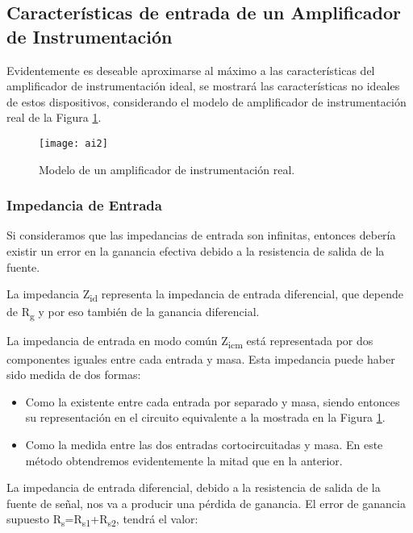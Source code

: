 \subsection{Características de entrada de un Amplificador de Instrumentación} %
\label{sec:caract_entrada_amplificadores}
Evidentemente es deseable aproximarse al máximo a las características del amplificador de instrumentación ideal, se mostrará las características no ideales de estos dispositivos, considerando el modelo de amplificador de instrumentación real de la Figura \ref{fig:aireal}.

\begin{figure}[h]
  \centering
  \texttt{[image: ai2]}
  \caption{Modelo de un amplificador de instrumentación real.}\label{fig:aireal}
\end{figure}

\subsubsection{Impedancia de Entrada} %
\label{impedancia_entrada}
Si consideramos que las impedancias de entrada son infinitas, entonces debería existir un error en la ganancia efectiva debido a la resistencia de salida de la fuente.

La impedancia Z\textsubscript{id} representa la impedancia de entrada diferencial, que depende de R\textsubscript{g} y por eso también de la ganancia diferencial.

La impedancia de entrada en modo común Z\textsubscript{icm} está representada por dos componentes iguales entre cada entrada y masa. Esta impedancia puede haber sido medida de dos formas:

\begin{itemize}
\item Como la existente entre cada entrada por separado y masa, siendo entonces su representación en el circuito equivalente a la mostrada en la Figura \ref{fig:aireal}.
\item Como la medida entre las dos entradas cortocircuitadas y masa. En este método obtendremos evidentemente la mitad que en la anterior.
\end{itemize}

La impedancia de entrada diferencial, debido a la resistencia de salida de la fuente de señal, nos va a producir una pérdida de ganancia. El error de ganancia supuesto R\textsubscript{s}=R\textsubscript{s1}+R\textsubscript{s2}, tendrá el valor:


